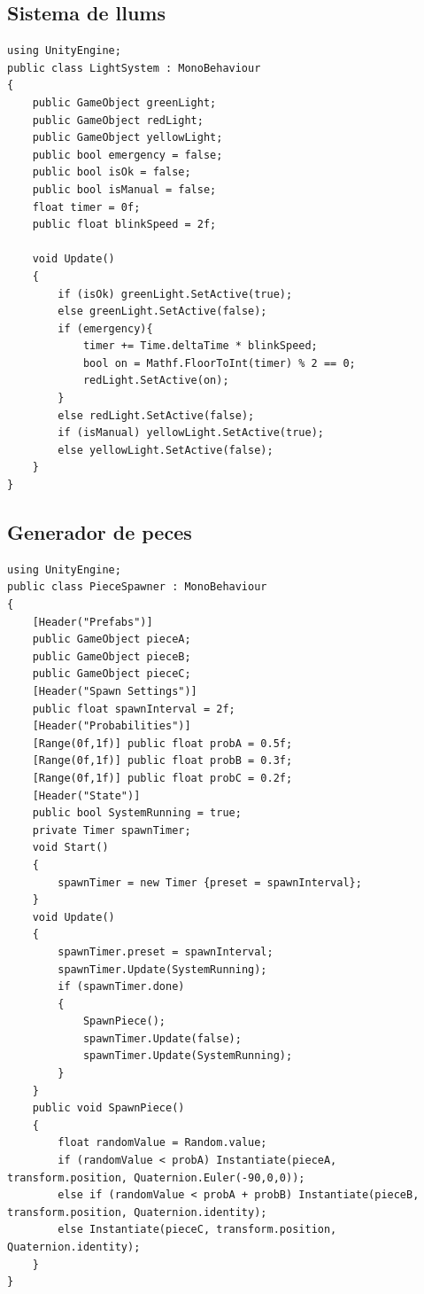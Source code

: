 \documentclass[a4paper,11pt,DIV=13,headings=normal,abstract=true,twoside=semi]{article}
\begin{document}
\subsection*{Sistema de llums}

\begin{lstlisting}[style=modern, caption={Sistema de llums d'estat}, label={lst:lightsystem}]
using UnityEngine;
public class LightSystem : MonoBehaviour
{
    public GameObject greenLight;
    public GameObject redLight;
    public GameObject yellowLight;
    public bool emergency = false;
    public bool isOk = false;
    public bool isManual = false;
    float timer = 0f;
    public float blinkSpeed = 2f;

    void Update()
    {
        if (isOk) greenLight.SetActive(true);
        else greenLight.SetActive(false);
        if (emergency){
            timer += Time.deltaTime * blinkSpeed;
            bool on = Mathf.FloorToInt(timer) % 2 == 0;
            redLight.SetActive(on);
        }
        else redLight.SetActive(false);
        if (isManual) yellowLight.SetActive(true);
        else yellowLight.SetActive(false);
    }
}
\end{lstlisting}
\subsection*{Generador de peces}

\begin{lstlisting}[style=modern, caption={Sistema de generació de peces}, label={lst:spawner}]
using UnityEngine;
public class PieceSpawner : MonoBehaviour
{
    [Header("Prefabs")]
    public GameObject pieceA;
    public GameObject pieceB;
    public GameObject pieceC;
    [Header("Spawn Settings")]
    public float spawnInterval = 2f;
    [Header("Probabilities")]
    [Range(0f,1f)] public float probA = 0.5f;
    [Range(0f,1f)] public float probB = 0.3f;
    [Range(0f,1f)] public float probC = 0.2f;
    [Header("State")]
    public bool SystemRunning = true;
    private Timer spawnTimer;
    void Start()
    {
        spawnTimer = new Timer {preset = spawnInterval};
    }
    void Update()
    {
        spawnTimer.preset = spawnInterval;
        spawnTimer.Update(SystemRunning);
        if (spawnTimer.done)
        {
            SpawnPiece();
            spawnTimer.Update(false); 
            spawnTimer.Update(SystemRunning); 
        }
    }
    public void SpawnPiece()
    {
        float randomValue = Random.value;
        if (randomValue < probA) Instantiate(pieceA, transform.position, Quaternion.Euler(-90,0,0));
        else if (randomValue < probA + probB) Instantiate(pieceB, transform.position, Quaternion.identity);
        else Instantiate(pieceC, transform.position, Quaternion.identity);
    }
}
\end{lstlisting}
\end{document}
